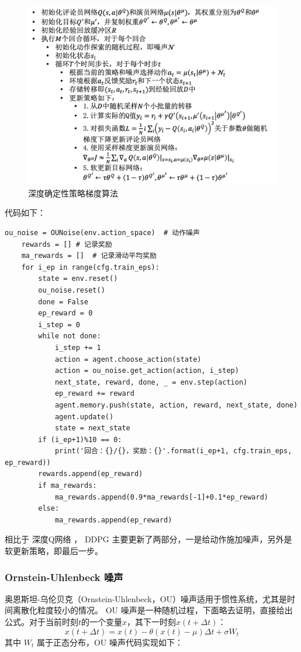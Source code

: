 \begin{figure}[htb]
    \centering
    \includegraphics[width=0.75\linewidth]{res/ch12/assets/ddpg.png}
    \caption{深度确定性策略梯度算法}
    \label{fig:ddpg}
\end{figure}

代码如下：

\begin{lstlisting}[style=Python]
    ou_noise = OUNoise(env.action_space)  # 动作噪声
    rewards = [] # 记录奖励
    ma_rewards = []  # 记录滑动平均奖励
    for i_ep in range(cfg.train_eps):
        state = env.reset()
        ou_noise.reset()
        done = False
        ep_reward = 0
        i_step = 0
        while not done:
            i_step += 1
            action = agent.choose_action(state)
            action = ou_noise.get_action(action, i_step) 
            next_state, reward, done, _ = env.step(action)
            ep_reward += reward
            agent.memory.push(state, action, reward, next_state, done)
            agent.update()
            state = next_state
        if (i_ep+1)%10 == 0:
            print('回合：{}/{}，奖励：{}'.format(i_ep+1, cfg.train_eps, ep_reward))
        rewards.append(ep_reward)
        if ma_rewards:
            ma_rewards.append(0.9*ma_rewards[-1]+0.1*ep_reward)
        else:
            ma_rewards.append(ep_reward)
\end{lstlisting}

相比于 深度Q网络 ， DDPG 主要更新了两部分，一是给动作施加噪声，另外是软更新策略，即最后一步。

\subsubsection{ Ornstein-Uhlenbeck 噪声}

奥恩斯坦-乌伦贝克（Ornstein-Uhlenbeck，OU）噪声适用于惯性系统，尤其是时间离散化粒度较小的情况。 OU 噪声是一种随机过程，下面略去证明，直接给出公式。对于当前时刻$t$的一个变量$x$，其下一时刻$x(t+\Delta t)$：
$$
x(t+\Delta t)=x(t)-\theta(x(t)-\mu) \Delta t+\sigma W_t
$$
其中 $W_t$ 属于正态分布，OU 噪声代码实现如下：

